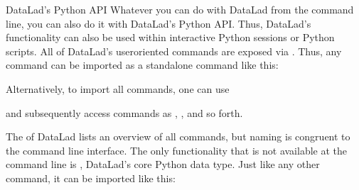 \ignorespaces {}\label{\detokenize{basics/101-130-yodaproject:pythonapi}}\begin{findoutmore}[label={fom-pythonapi}, before title={\thetcbcounter\ }, float, check odd page=true]{DataLad’s Python API}
\label{\detokenize{basics/101-130-yodaproject:fom-pythonapi}}
\label{\detokenize{basics/101-130-yodaproject:python}}
\sphinxAtStartPar
Whatever you can do with DataLad from the command line, you can also do it with
DataLad’s Python API.
Thus, DataLad’s functionality can also be used within interactive Python sessions
or Python scripts.
All of DataLad’s user\sphinxhyphen{}oriented commands are exposed via .
Thus, any command can be imported as a stand\sphinxhyphen{}alone command like this:

\begin{sphinxVerbatim}[commandchars=\\\{\}]
   
\end{sphinxVerbatim}

\sphinxAtStartPar
Alternatively, to import all commands, one can use

\begin{sphinxVerbatim}[commandchars=\\\{\}]
   
\end{sphinxVerbatim}

\sphinxAtStartPar
and subsequently access commands as , , and so forth.

\sphinxAtStartPar
The 
of DataLad lists an overview of all commands, but naming is congruent to the
command line interface. The only functionality that is not available at the
command line is , DataLad’s core Python data type.
Just like any other command, it can be imported like this:

\begin{sphinxVerbatim}[commandchars=\\\{\}]
   
\end{sphinxVerbatim}


\end{findoutmore}
